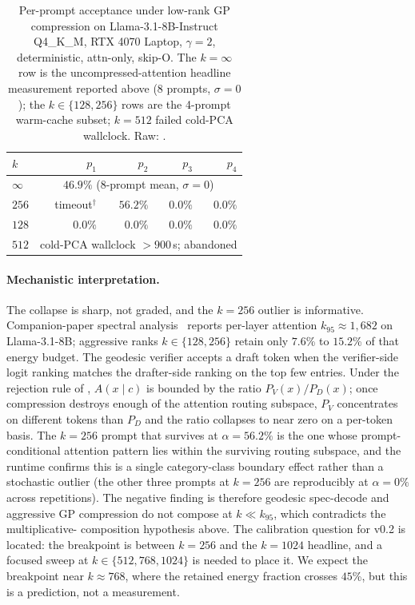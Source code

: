 \documentclass[11pt]{article}
\begin{document}
\begin{table}[h]\centering\small
\caption{Per-prompt acceptance under low-rank GP compression on
Llama-3.1-8B-Instruct Q4\_K\_M, RTX 4070 Laptop, $\gamma{=}2$,
deterministic, attn-only, skip-O. The $k{=}\infty$ row is the
uncompressed-attention headline measurement reported above
(8 prompts, $\sigma{=}0$); the $k{\in}\{128, 256\}$ rows are the
4-prompt warm-cache subset; $k{=}512$ failed cold-PCA wallclock.
Raw: \protect{}.}
\label{tab:accept-collapse}
\begin{tabular}{@{}lrrrr@{}}
\toprule
$k$ & $p_1$ & $p_2$ & $p_3$ & $p_4$ \\
\midrule
$\infty$ & \multicolumn{4}{c}{$46.9\%$ (8-prompt mean, $\sigma{=}0$)} \\
$256$ & timeout$^\dagger$ & $56.2\%$ & $0.0\%$ & $0.0\%$ \\
$128$ & $0.0\%$ & $0.0\%$ & $0.0\%$ & $0.0\%$ \\
$512$ & \multicolumn{4}{c}{cold-PCA wallclock $>900$\,s; abandoned} \\
\bottomrule
\end{tabular}
\end{table}

\paragraph{Mechanistic interpretation.} The collapse is sharp, not
graded, and the $k{=}256$ outlier is informative. Companion-paper
spectral analysis~\cite{stewart2026grc} reports per-layer attention
$k_{95}{\approx}1{,}682$ on Llama-3.1-8B; aggressive ranks
$k\in\{128, 256\}$ retain only $7.6$\% to $15.2$\% of that energy budget.
The geodesic verifier accepts a draft token when the verifier-side
logit ranking matches the drafter-side ranking on the top few entries.
Under the rejection rule of , $A(x{\mid}c)$ is bounded
by the ratio $P_V(x)/P_D(x)$; once compression destroys enough of the
attention routing subspace, $P_V$ concentrates on different tokens
than $P_D$ and the ratio collapses to near zero on a per-token basis.
The $k{=}256$ prompt that survives at $\alpha{=}56.2\%$ is the one
whose prompt-conditional attention pattern lies within the surviving
routing subspace, and the runtime confirms this is a single
category-class boundary effect rather than a stochastic outlier (the
other three prompts at $k{=}256$ are reproducibly at $\alpha{=}0\%$
across repetitions). The negative finding is therefore
geodesic spec-decode and aggressive GP compression do not
compose at $k\ll k_{95}$, which contradicts the multiplicative-
composition hypothesis above. The calibration question for v0.2 is
located: the breakpoint is between $k{=}256$ and the $k{=}1024$
headline, and a focused sweep at $k\in\{512, 768, 1024\}$ is needed
to place it. We expect the breakpoint near $k\approx 768$, where the
retained energy fraction crosses $45$\%, but this is a prediction,
not a measurement.
\end{document}
